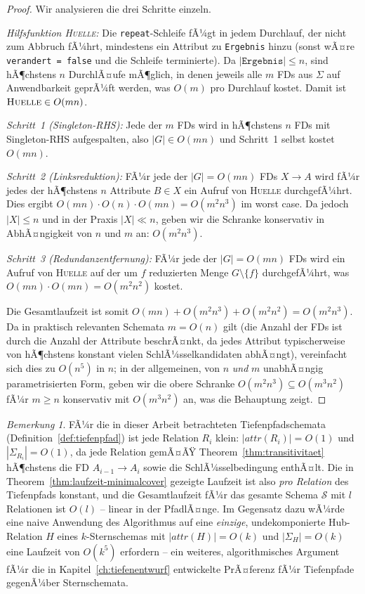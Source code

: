 ﻿\documentclass[a4paper,12pt]{report}
\theoremstyle{definition}
\theoremstyle{remark}
\newtheorem{remark}{Bemerkung}[chapter]
\newcommand{\att}{\mathit{attr}}
\begin{document}
\begin{proof}
Wir analysieren die drei Schritte einzeln.

\emph{Hilfsfunktion \textsc{Huelle}:} Die \texttt{repeat}-Schleife
fÃ¼gt in jedem Durchlauf, der nicht zum Abbruch fÃ¼hrt, mindestens ein
Attribut zu \texttt{Ergebnis} hinzu (sonst wÃ¤re \texttt{verandert =
false} und die Schleife terminierte). Da $|\texttt{Ergebnis}|\leq n$,
sind hÃ¶chstens $n$ DurchlÃ¤ufe mÃ¶glich, in denen jeweils alle $m$ FDs
aus $\Sigma$ auf Anwendbarkeit geprÃ¼ft werden, was $O(m)$ pro
Durchlauf kostet. Damit ist $\textsc{Huelle}\in O(mn)$.

\emph{Schritt~1 (Singleton-RHS):} Jede der $m$ FDs wird in hÃ¶chstens
$n$ FDs mit Singleton-RHS aufgespalten, also $|G|\in O(mn)$ und
Schritt~1 selbst kostet $O(mn)$.

\emph{Schritt~2 (Linksreduktion):} FÃ¼r jede der $|G|=O(mn)$ FDs $X\to
A$ wird fÃ¼r jedes der hÃ¶chstens $n$ Attribute $B\in X$ ein Aufruf von
\textsc{Huelle} durchgefÃ¼hrt. Dies ergibt
$O(mn)\cdot O(n)\cdot O(mn)=O(m^2n^3)$ im worst case. Da jedoch $|X|\leq
n$ und in der Praxis $|X|\ll n$, geben wir die Schranke konservativ in
AbhÃ¤ngigkeit von $n$ und $m$ an: $O(m^2 n^3)$.

\emph{Schritt~3 (Redundanzentfernung):} FÃ¼r jede der $|G|=O(mn)$ FDs
wird ein Aufruf von \textsc{Huelle} auf der um $f$ reduzierten Menge
$G\setminus\{f\}$ durchgefÃ¼hrt, was $O(mn)\cdot O(mn)=O(m^2n^2)$
kostet.

Die Gesamtlaufzeit ist somit
$O(mn)+O(m^2n^3)+O(m^2n^2)=O(m^2n^3)$.
Da in praktisch relevanten Schemata $m=O(n)$ gilt (die Anzahl der FDs
ist durch die Anzahl der Attribute beschrÃ¤nkt, da jedes Attribut
typischerweise von hÃ¶chstens konstant vielen SchlÃ¼sselkandidaten
abhÃ¤ngt), vereinfacht sich dies zu $O(n^5)$ in $n$; in der allgemeinen,
von $n$ \emph{und} $m$ unabhÃ¤ngig parametrisierten Form, geben wir die
obere Schranke $O(m^2 n^3) \subseteq O(m^3 n^2)$ fÃ¼r $m\geq n$ konservativ
mit $O(m^3n^2)$ an, was die Behauptung zeigt. \qedhere
\end{proof}

\begin{remark}
FÃ¼r die in dieser Arbeit betrachteten Tiefenpfadschemata
(Definition~\ref{def:tiefenpfad}) ist jede Relation $R_i$ klein:
$|\att(R_i)|=O(1)$ und $|\Sigma_{R_i}|=O(1)$, da jede Relation gemÃ¤ÃŸ
Theorem~\ref{thm:transitivitaet} hÃ¶chstens die FD
$A_{i-1}\to A_i$ sowie die SchlÃ¼sselbedingung enthÃ¤lt. Die in
Theorem~\ref{thm:laufzeit-minimalcover} gezeigte Laufzeit ist also
\emph{pro Relation} des Tiefenpfads konstant, und die
Gesamtlaufzeit fÃ¼r das gesamte Schema $\mathcal{S}$ mit $l$ Relationen
ist $O(l)$ -- linear in der PfadlÃ¤nge. Im Gegensatz dazu wÃ¼rde eine
naive Anwendung des Algorithmus auf eine \emph{einzige}, undekomponierte
Hub-Relation $H$ eines $k$-Sternschemas mit $|\att(H)|=O(k)$ und
$|\Sigma_H|=O(k)$ eine Laufzeit von $O(k^5)$ erfordern -- ein weiteres,
algorithmisches Argument fÃ¼r die in Kapitel~\ref{ch:tiefenentwurf}
entwickelte PrÃ¤ferenz fÃ¼r Tiefenpfade gegenÃ¼ber Sternschemata.
\end{remark}
\end{document}
